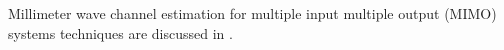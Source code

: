 Millimeter wave channel estimation for multiple input multiple output (MIMO) systems
techniques are discussed in \cite{lee2016channel}.
